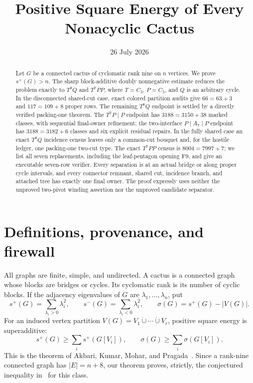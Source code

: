 \documentclass[11pt]{article}
\title{Positive Square Energy of Every Nonacyclic Cactus}
\author{}
\date{26 July 2026}
\newcommand{\spE}{s^+}
\newcommand{\smE}{s^-}
\newcommand{\sig}{\sigma}
\begin{document}
\maketitle

\begin{abstract}
Let $G$ be a connected cactus of cyclomatic rank nine on $n$ vertices.  We
prove $s^+(G)>n$.  The sharp block-additive doubly nonnegative estimate reduces
the problem exactly to $T^8Q$ and $T^7PP$, where $T=C_3$, $P=C_5$, and $Q$ is
an arbitrary cycle.  In the disconnected shared-cut case, exact colored
partition audits give $66=63+3$ and $117=109+8$ proper rows.  The remaining
$T^8Q$ endpoint is settled by a directly verified packing-one theorem.  The
$T^7P\mid P$ endpoint has $3188=3150+38$ marked classes, with sequential
final-owner refinement; the two-interface $P\mid A_7\mid P$ endpoint has
$3188=3182+6$ classes and six explicit residual repairs.  In the fully shared
case an exact $T^8Q$ incidence census leaves only a common-cut bouquet and, for
the hostile ledger, one packing-one two-cut type.  The exact $T^7PP$ census is
$8004=7997+7$; we list all seven replacements, including the leaf-pentagon
opening F9, and give an executable seven-row verifier.  Every separation is at
an actual bridge or along proper cycle intervals, and every connector remnant,
shared cut, incidence branch, and attached tree has exactly one final owner.
The proof expressly uses neither the unproved two-pivot winding assertion nor
the unproved candidate separator.
\end{abstract}

\section{Definitions, provenance, and firewall}

All graphs are finite, simple, and undirected.  A cactus is a connected graph
whose blocks are bridges or cycles.  Its cyclomatic rank is its number of
cyclic blocks.  If the adjacency eigenvalues of $G$ are
$\lambda_1,\ldots,\lambda_n$, put
\[
 \spE(G)=\sum_{\lambda_i>0}\lambda_i^2,
 \qquad \smE(G)=\sum_{\lambda_i<0}\lambda_i^2,
 \qquad \sig(G)=\spE(G)-|V(G)|.
\]
For an induced vertex partition $V(G)=V_1\mathbin{\dot\cup}\cdots
\mathbin{\dot\cup}V_r$, positive square energy is superadditive:
\begin{equation}\label{eq:super}
 \spE(G)\geq\sum_i\spE(G[V_i]),
 \qquad \sig(G)\geq\sum_i\sig(G[V_i]).
\end{equation}
This is the theorem of Akbari, Kumar, Mohar, and Pragada~\cite{AKMP}.
Since a rank-nine connected graph has $|E|=n+8$, our theorem proves, strictly,
the conjectured inequality in~\cite[Conjecture~1.2]{AKMPZ} for this class.
\end{document}
